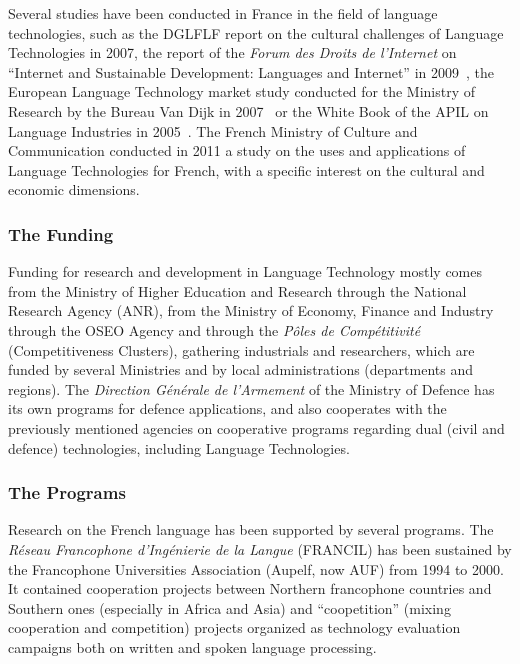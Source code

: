 \begin{multicols}{2}
Several studies have been conducted in France in the field of language
technologies, such as the DGLFLF report on the cultural challenges of
Language Technologies in 2007\cite{dglflf07}, the report of the {\em Forum des Droits de
l'Internet} on ``Internet and Sustainable Development: Languages and Internet'' in 2009~\cite{droitsinternet07}, the
European Language Technology market study conducted for the Ministry
of Research by the Bureau Van Dijk in 2007~\cite{vandijk07} or the White Book of the
APIL on Language Industries in 2005~\cite{apil05}. The French Ministry of Culture
and Communication conducted in 2011 a study on the uses and
applications of Language Technologies for French, with a specific
interest on the cultural and economic dimensions.

\subsubsection{The Funding}
Funding for research and development in Language Technology mostly
comes from the Ministry of Higher Education and Research through the
National Research Agency (ANR), from the Ministry of Economy, Finance
and Industry through the OSEO Agency and through the {\em Pôles de
Compétitivité} (Competitiveness Clusters), gathering industrials and
researchers, which are funded by several Ministries and by local
administrations (departments and regions). The {\em Direction Générale de
l'Armement} of the Ministry of Defence has its own programs for defence
applications, and also cooperates with the previously mentioned
agencies on cooperative programs regarding dual (civil and defence)
technologies, including Language Technologies.

\subsubsection{The Programs}
Research on the French language has been supported by several
programs. The {\em Réseau Francophone d’Ingénierie de la Langue} (FRANCIL)
has been sustained by the Francophone Universities Association
(Aupelf, now AUF) from 1994 to 2000. It contained cooperation projects
between Northern francophone countries and Southern ones (especially
in Africa and Asia) and ``coopetition'' (mixing cooperation and
competition) projects organized as technology evaluation campaigns
both on written and spoken language processing.


\end{multicols}
